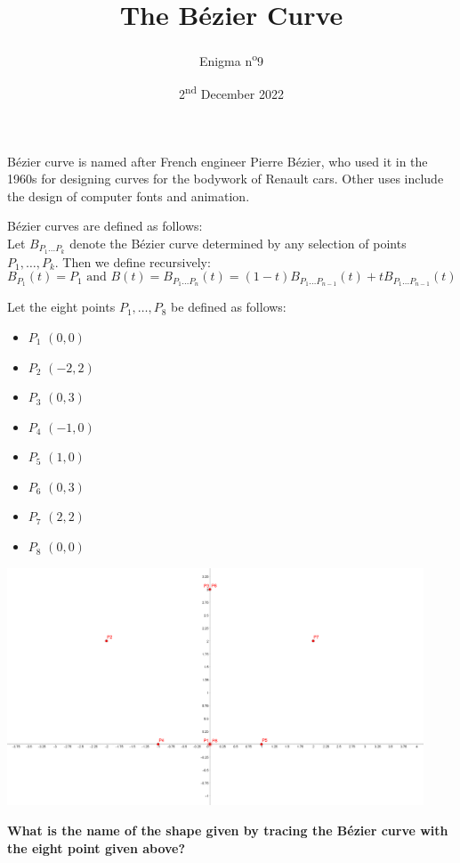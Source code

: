 \documentclass[a4paper, top=10mm]{article}
\title{\textbf{\huge{The Bézier Curve}}}
\author{Enigma n\textsuperscript{o}9}
\date{2\textsuperscript{nd} December 2022}
\begin{document}
	\maketitle
	
	Bézier curve is named after French engineer Pierre Bézier, who used it in the 1960s for designing curves for the bodywork of Renault cars.
	Other uses include the design of computer fonts and animation.
	
	Bézier curves are defined as follows:\\
	Let $B_{P_1 \dots P_k}$ denote the Bézier curve determined by any selection of points $P_1, \dots, P_k$.
	Then we define recursively:
	$$B_{P_1}(t) = P_1 \text{ and } B(t) = B_{P_1 \dots P_n}(t) = (1-t) B_{P_1 \dots P_{n-1}}(t) + t B_{P_1 \dots P_{n-1}}(t)$$

	Let the eight points $P_1, \dots, P_8$ be defined as follows:
	\begin{itemize}
		\item $P_1$ $(0,0)$
		\item $P_2$ $(-2,2)$
		\item $P_3$ $(0,3)$
		\item $P_4$ $(-1,0)$
		\item $P_5$ $(1,0)$
		\item $P_6$ $(0,3)$
		\item $P_7$ $(2,2)$
		\item $P_8$ $(0,0)$
	\end{itemize}
	
	\begin{center}
		\includegraphics[height=200pt]{09points.png}
	\end{center}
	
	\textbf{What is the name of the shape given by tracing the Bézier curve with the eight point given above?}

	\vspace{2cm}
	
\end{document}
